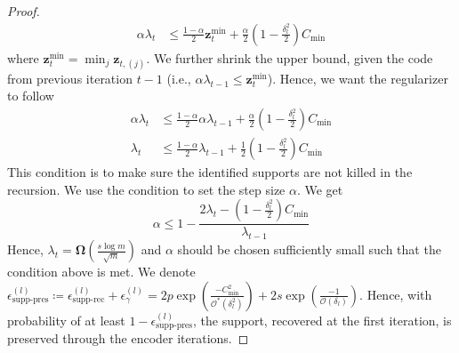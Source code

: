 \documentclass[10pt]{article} %
\newcommand{\z}{{\bm z}}
\begin{document}
\begin{proof}
\begin{equation}
\begin{aligned}
\alpha \lambda_t &\leq \frac{1 - \alpha}{2} \z_t^{\min} + \frac{\alpha}{2} (1 - \frac{\delta_l^2}{2}) C_{\min}
\end{aligned}
\end{equation}
where $\z_t^{\min} = \min_{j} \z_{t,(j)}$. We further shrink the upper bound, given the code from previous iteration $t-1$ (i.e., $\alpha \lambda_{t-1} \leq \z_t^{\min}$). Hence, we want the regularizer to follow
%
\begin{equation}
\begin{aligned}
\alpha \lambda_t &\leq \frac{1 - \alpha}{2} \alpha \lambda_{t-1}  + \frac{\alpha}{2} (1 - \frac{\delta_l^2}{2}) C_{\min}\\
\lambda_t &\leq \frac{1 - \alpha}{2} \lambda_{t-1}  + \frac{1}{2} (1 - \frac{\delta_l^2}{2}) C_{\min}
\end{aligned}
\end{equation}
This condition is to make sure the identified supports are not killed in the recursion. We use the condition to set the step size $\alpha$. We get
\begin{equation}
\alpha \leq 1 - \frac{2\lambda_t - (1 - \frac{\delta_l^2}{2}) C_{\min}}{\lambda_{t-1}}
\end{equation}
Hence, $\lambda_t = {\bm \Omega}(\frac{s \log{m}}{\sqrt{m}})$ and $\alpha$ should be chosen sufficiently small such that the condition above is met. We denote $\epsilon^{(l)}_{\text{supp-pres}} \coloneqq \epsilon^{(l)}_{\text{supp-rec}} + \epsilon^{(l)}_{\gamma} = 2 p \exp{(\frac{-C_{\min}^2}{\mathcal{O}^{\ast}(\delta_l^2)})}+ 2 s \exp{(\frac{-1}{\mathcal{O}(\delta_l)})}$. Hence, with probability of at least $1 - \epsilon^{(l)}_{\text{supp-pres}}$, the support, recovered at the first iteration, is preserved through the encoder iterations.
\end{proof}
\end{document}
